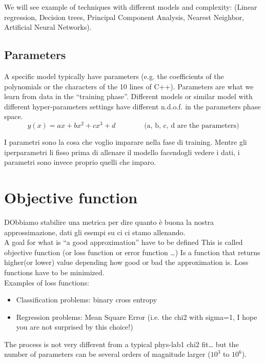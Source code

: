 We will see example of techniques with different models and complexity: (Linear regression, Decision trees, Principal Component Analysis, Nearest Neighbor, Artificial Neural Networks).

\subsection{Parameters}

A specific model typically have parameters (e.g. the coefficients of the polynomials or the characters of the 10 lines of C++).
Parameters are what we learn from data in the “training phase”.
Different models or similar model with different hyper-parameters settings have different n.d.o.f. in the parameters phase space.
\begin{equation*}
	y(x) = ax + bx^2 + cx^3 + d \qquad \qquad	\text{(a, b, c, d are the parameters)}
\end{equation*}

I parametri sono la cosa che voglio imparare nella fase di training. Mentre gli iperparametri li fisso prima di allenare il modello facendogli vedere i dati, i parametri sono invece proprio quelli che imparo.

\section{Objective function}
DObbiamo stabilire una metrica per dire quanto è buona la nostra approssimazione, dati gli esempi su ci ci stamo allenando.\\

A goal for what is “a good approximation” have to be defined This is called objective function (or loss function or error function …) Is a function that returns higher(or lower) value depending how good or bad the approximation is. Loss functions have to be minimized.\\
Examples of loss functions:
\begin{itemize}
	\item Classification problems: binary cross entropy
	\item Regression problems: Mean Square Error (i.e. the chi2 with sigma=1, I hope you are not surprised by this choice!)
\end{itemize}

The process is not very different from a typical phys-lab1 chi2 fit… but the number
of parameters can be several orders of magnitude larger ($10^3$ to $10^6$).

